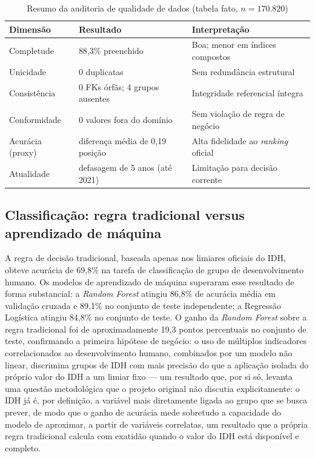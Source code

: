 \documentclass[11pt,a4paper]{article}
\begin{document}
\begin{table}[h]
\centering
\caption{Resumo da auditoria de qualidade de dados (tabela fato, $n=170.820$)}
\label{tab:qualidade}
\begin{tabular}{@{}lll@{}}
\toprule
\textbf{Dimensão} & \textbf{Resultado} & \textbf{Interpretação} \\
\midrule
Completude & 88,3\% preenchido & Boa; menor em índices compostos \\
Unicidade & 0 duplicatas & Sem redundância estrutural \\
Consistência & 0 FKs órfãs; 4 grupos ausentes & Integridade referencial íntegra \\
Conformidade & 0 valores fora do domínio & Sem violação de regra de negócio \\
Acurácia (proxy) & diferença média de 0,19 posição & Alta fidelidade ao \textit{ranking} oficial \\
Atualidade & defasagem de 5 anos (até 2021) & Limitação para decisão corrente \\
\bottomrule
\end{tabular}
\end{table}

\subsection{Classificação: regra tradicional versus aprendizado de máquina}

A regra de decisão tradicional, baseada apenas nos limiares oficiais do IDH, obteve acurácia de 69,8\% na tarefa de classificação de grupo de desenvolvimento humano. Os modelos de aprendizado de máquina superaram esse resultado de forma substancial: a \textit{Random Forest} atingiu 86,8\% de acurácia média em validação cruzada e 89,1\% no conjunto de teste independente; a Regressão Logística atingiu 84,8\% no conjunto de teste. O ganho da \textit{Random Forest} sobre a regra tradicional foi de aproximadamente 19,3 pontos percentuais no conjunto de teste, confirmando a primeira hipótese de negócio: o uso de múltiplos indicadores correlacionados ao desenvolvimento humano, combinados por um modelo não linear, discrimina grupos de IDH com mais precisão do que a aplicação isolada do próprio valor do IDH a um limiar fixo --- um resultado que, por si só, levanta uma questão metodológica que o projeto original não discutia explicitamente: o IDH já é, por definição, a variável mais diretamente ligada ao grupo que se busca prever, de modo que o ganho de acurácia mede sobretudo a capacidade do modelo de aproximar, a partir de variáveis correlatas, um resultado que a própria regra tradicional calcula com exatidão quando o valor do IDH está disponível e completo.
\end{document}
